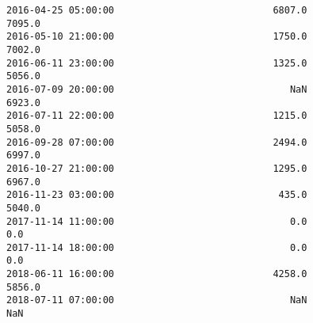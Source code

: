 \documentclass[11pt]{article}
\begin{document}
\begin{tcolorbox}[breakable, size=fbox, boxrule=.5pt, pad at break*=1mm, opacityfill=0]
\begin{Verbatim}[commandchars=\\\{\}]
2016-04-25 05:00:00                            6807.0              7095.0
2016-05-10 21:00:00                            1750.0              7002.0
2016-06-11 23:00:00                            1325.0              5056.0
2016-07-09 20:00:00                               NaN              6923.0
2016-07-11 22:00:00                            1215.0              5058.0
2016-09-28 07:00:00                            2494.0              6997.0
2016-10-27 21:00:00                            1295.0              6967.0
2016-11-23 03:00:00                             435.0              5040.0
2017-11-14 11:00:00                               0.0                 0.0
2017-11-14 18:00:00                               0.0                 0.0
2018-06-11 16:00:00                            4258.0              5856.0
2018-07-11 07:00:00                               NaN                 NaN


\end{Verbatim}
\end{tcolorbox}
\end{document}

